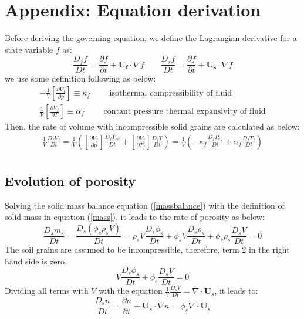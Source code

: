 \documentclass[preprint,12pt]{elsarticle}
\begin{document}

\section{\textsf{Appendix: Equation derivation}}
%
%
Before deriving the governing equation, we define the Lagrangian derivative for a state variable $f$ as:
%
%
\begin{equation}
\frac{D_f f}{Dt} =  \frac{\partial f}{\partial t} + \pmb{U_f} \cdot \nabla f \qquad
\frac{D_s f}{Dt} =  \frac{\partial f}{\partial t} + \pmb{U_s} \cdot \nabla f
\end {equation}
%
%
we use some definition following \cite{Kashiwa} as below:
%
%
\begin{gather}
-\frac{1}{V} \left[ \frac{\partial V_f}{\partial p} \right] \equiv \kappa_f \qquad \mbox{ isothermal compressibility of fluid} \\
\frac{1}{V} \left[ \frac{\partial V_f}{\partial T} \right] \equiv \alpha_f \qquad \mbox{ contant pressure thermal expansivity of fluid}
\end {gather}
%
%
Then, the rate of volume with incompressible solid grains are calculated as below:
%
%
\begin{equation}
\label{fluidvolumerate}
\begin{gathered}
   \frac{1}{V} \frac{D_f V_f}{Dt} = \frac{1}{V} \left( \left[ \frac{\partial V_f}{\partial p} \right] \frac{D_f P_{eq}}{D t} + \left[ \frac{\partial V_f}{\partial T_f} \right] \frac{D_f T}{D t} \right) = \frac{1}{V} \left( -\kappa_f \frac{D_f P_{eq}}{D t} + \alpha_f \frac{D_f T_f}{D t} \right) \\
\end {gathered}
\end {equation}
%
%
\subsection{\textsf{Evolution of porosity}}
%
%
Solving the solid mass balance equation (\ref{massbalance}) with the definition of solid mass in equation (\ref{mass}), it leads to the rate of porosity as below:
%
%
\begin{equation}
   \frac{D_sm_s}{Dt} = \frac{D_s(\phi_s \rho_s V)}{Dt} = \rho_s V \frac{D_s \phi_s}{Dt} + \phi_s V \frac{D_s \rho_s}{Dt} + \phi_s \rho_s  \frac{D_s V}{Dt} = 0  
\end {equation}
%
%
The soil grains are assumed to be incompressible, therefore, term 2 in the right hand side is zero. 
%
%
\begin{equation}
  V \frac{D_s \phi_s}{Dt} + \phi_s \frac{D_s V}{Dt} = 0  
\end {equation}
%
%
Dividing all terms with $V$ with the equation $\frac{1}{V} \frac{D_s V}{Dt} = \nabla \cdot \pmb{U}_s $, it leads to:
%
%
\begin{equation}
  \frac{D_s n}{Dt} = \frac{\partial n}{\partial t} + \pmb{U}_s \cdot \nabla n = 
  \phi_s \nabla \cdot \pmb{U}_s  
\end {equation}
%
%
\end{document}

